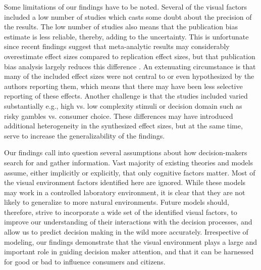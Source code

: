 \documentclass[english,natbib,man,floatsintext]{apa6}
\begin{document}
Some limitations of our findings have to be noted. Several of the visual factors included a low number of studies which casts some doubt about the precision of the results. The low number of studies also means that the publication bias estimate is less reliable, thereby, adding to the uncertainty. This is unfortunate since recent findings suggest that meta-analytic results may considerably overestimate effect sizes compared to replication effect sizes, but that publication bias analysis largely reduces this difference \citep{kvarven2020}. An extenuating circumstance is that many of the included effect sizes were not central to or even hypothesized by the authors reporting them, which means that there may have been less selective reporting of these effects. Another challenge is that the studies included varied substantially e.g., high vs. low complexity stimuli or decision domain such as risky gambles vs. consumer choice. These differences may have introduced additional heterogeneity in the synthesized effect sizes, but at the same time, serve to increase the generalizability of the findings. 



Our findings call into question several assumptions about how decision-makers search for and gather information. Vast majority of existing theories and models assume, either implicitly or explicitly, that only cognitive factors matter. Most of the visual environment factors identified here are ignored. While these models may work in a controlled laboratory environment, it is clear that they are not likely to generalize to more natural environments. Future models should, therefore, strive to incorporate a wide set of the identified visual factors, to improve our understanding of their interactions with the decision processes, and allow us to predict decision making in the wild more accurately. Irrespective of modeling, our findings demonstrate that the visual environment plays a large and important role in guiding decision maker attention, and that it can be harnessed for good or bad to influence consumers and citizens.  


\end{document}
